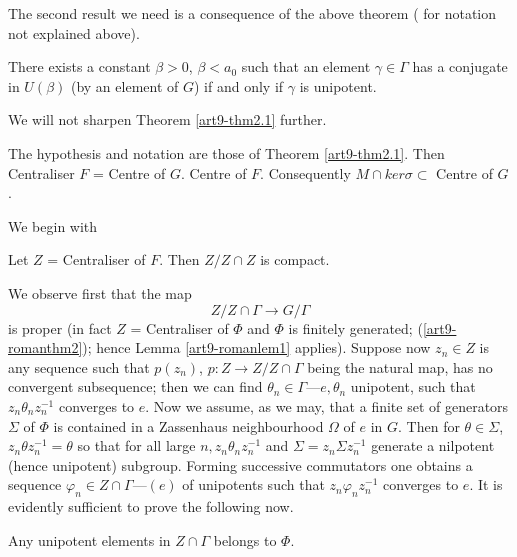 The second result we need is a consequence of the above theorem ( for notation not explained above).

\begin{theorem}\label{art9-thm2.2}
There exists a constant $\beta > 0$, $\beta < a_0$ such that an element $\gamma \in \Gamma$ has a conjugate in $U (\beta)$ (by an element of $G$) if and only if $\gamma$ is unipotent.
\end{theorem}

We will not sharpen Theorem \ref{art9-thm2.1} further.

\begin{theorem}\label{art9-thm2.3}
The hypothesis and notation are those of Theorem \ref{art9-thm2.1}. Then Centraliser $F$ = Centre of $G$. Centre of $F$. Consequently $M \cap ker \sigma \subset$ Centre of $G$. 
\end{theorem}

We begin with 

\setcounter{claim}{3}
\begin{claim}\label{art9-claim2.4}
Let $Z$ = Centraliser of $F$. Then $Z/Z \cap Z$ is compact.
\end{claim}

We observe first that the map
$$
Z/Z \cap \Gamma \to G/ \Gamma
$$
is proper (in fact $Z$ = Centraliser of $\Phi$ and $\Phi$ is finitely generated; (\ref{art9-romanthm2}); hence Lemma \ref{art9-romanlem1} applies). Suppose now $z_n \in Z$ is any sequence such that $p (z_n)$, $p: Z \to Z/Z \cap \Gamma$ being the natural map, has no convergent subsequence; then we can find $\theta_n \in\Gamma$---$e,\theta_n$ unipotent, such that $z_n \theta_n z_n^{-1}$ converges to $e$. Now we assume, as we  may, that a finite set of generators $\Sigma$ of $\Phi$ is contained in a Zassenhaus neighbourhood $\Omega$ of $e$ in $G$. Then for $\theta \in \Sigma$, $z_n \theta z_n^{-1}=\theta$ so that for all large $n, z_n \theta_n z^{-1}_n$  and $\Sigma = z_n \Sigma z^{-1}_n$ generate a nilpotent (hence unipotent) subgroup. Forming successive commutators one obtains a sequence $\varphi_n \in Z \cap \Gamma$---$(e)$ of unipotents such that $z_n \varphi_n z^{-1}_n$ converges to $e$. It is evidently sufficient to prove the following now.

\setcounter{assertion}{4}
\begin{assertion}\label{art9-asser2.5}
Any unipotent elements in $Z \cap \Gamma$ belongs to $\Phi$.
\end{assertion}

